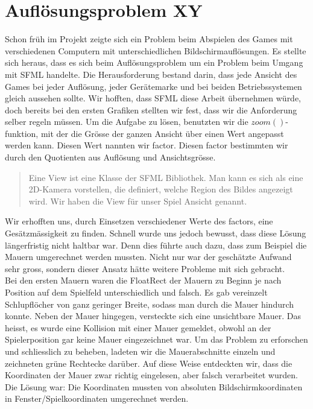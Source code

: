 \documentclass[11pt,a4paper]{scrbook}
\begin{document}
\section{Auflösungsproblem XY}     
\label{aufloesungsprobleme}
Schon früh im Projekt zeigte sich ein Problem beim Abspielen des Games mit verschiedenen Computern mit unterschiedlichen Bildschirmauflösungen. Es stellte sich heraus, dass es sich
beim Auflösungsproblem um ein Problem beim Umgang mit SFML handelte.
Die Herausforderung bestand darin, dass jede Ansicht des Games bei jeder Auflösung, jeder Gerätemarke und bei beiden Betriebssystemen gleich aussehen sollte.
Wir hofften, dass SFML diese Arbeit übernehmen würde, doch bereits bei den ersten Grafiken stellten wir fest, dass wir die Anforderung selber regeln müssen.
Um die Aufgabe zu lösen, benutzten wir die $zoom()$-funktion, mit der die Grösse der ganzen Ansicht über einen Wert angepasst werden kann.
Diesen Wert nannten wir factor.
Diesen factor bestimmten wir durch den Quotienten aus Auflösung und Ansichtsgrösse.
\begin{quote}
Eine View ist eine Klasse der SFML Bibliothek.
Man kann es sich als eine 2D-Kamera vorstellen, die definiert, welche Region des Bildes angezeigt wird.
Wir haben die View für unser Spiel Ansicht genannt.
\end{quote}
Wir erhofften uns, durch Einsetzen verschiedener Werte des factors, eine Gesätzmässigkeit zu finden.
Schnell wurde uns jedoch bewusst, dass diese Lösung längerfristig nicht haltbar war. 
Denn dies führte auch dazu, dass zum Beispiel die Mauern umgerechnet werden mussten.
Nicht nur war der geschätzte Aufwand sehr gross, sondern dieser Ansatz hätte weitere Probleme mit sich gebracht.
\\
\label{mauern}
Bei den ersten Mauern waren die FloatRect der Mauern zu Beginn je nach Position auf dem Spielfeld unterschiedlich und falsch.
Es gab vereinzelt Schlupflöcher von ganz geringer Breite, sodass man durch die Mauer hindurch konnte. 
Neben der Mauer hingegen, versteckte sich eine unsichtbare Mauer. 
Das heisst, es wurde eine Kollision mit einer Mauer gemeldet, obwohl an der Spielerposition gar keine Mauer eingezeichnet war. 
Um das Problem zu erforschen und schliesslich zu beheben, ladeten
wir die Mauerabschnitte einzeln und zeichneten grüne Rechtecke darüber. 
Auf diese Weise entdeckten wir, dass die Koordinaten der Mauer zwar richtig eingelesen, aber falsch verarbeitet wurden. Die Lösung war: Die Koordinaten mussten
von absoluten Bildschirmkoordinaten in Fenster/Spielkoordinaten umgerechnet werden. 
\end{document}
